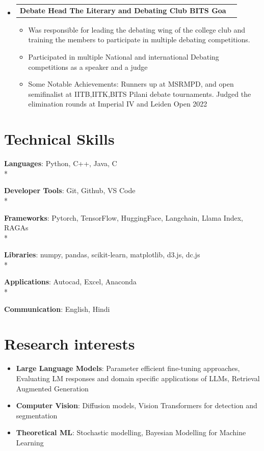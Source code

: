 \documentclass[letterpaper,11pt]{article}
\makeatletter
\newcommand{\resumeItem}[1]{
  \item\small{
    {#1 \vspace{-1pt}}
  }
}
\newcommand{\resumeProjectHeading}[2]{
  \item
  \begin{tabular*}{0.97\textwidth}{l@{\extracolsep{\fill}}r}
    \textbf{#1} & #2 \\
  \end{tabular*}\vspace{-7pt}
}
\newcommand{\resumeSubHeadingListStart}{\begin{itemize}[leftmargin=0.15in, label={}]}
\newcommand{\resumeSubHeadingListEnd}{\end{itemize}}
\newcommand{\resumeItemListStart}{\begin{itemize}}
\newcommand{\resumeItemListEnd}{\end{itemize}\vspace{-5pt}}
\makeatother
\begin{document}
\resumeSubHeadingListStart
\resumeProjectHeading
  {\textbf{Debate Head} \hfill \textbf{The Literary and Debating Club BITS Goa}} {}
  \resumeItemListStart
  \resumeItem{Was responsible for leading the debating wing of the college club and training the members to participate in multiple debating competitions.}
  \resumeItem{Participated in multiple National and international Debating competitions as a speaker and a judge}
  \resumeItem{Some Notable Achievements: Runners up at MSRMPD, and open semifinalist at IITB,IITK,BITS Pilani debate tournaments. Judged the elimination rounds at Imperial IV and Leiden Open 2022}
  \resumeItemListEnd
\resumeSubHeadingListEnd

\section{Technical Skills}

\begin{itemize}[label={}]
  \small{
    \item \textbf{Languages}{: Python, C++, Java, C} \\* %
    \item \textbf{Developer Tools}{: Git, Github, VS Code} \\*
    \item \textbf{Frameworks}{: Pytorch, TensorFlow, HuggingFace, Langchain, Llama Index, RAGAs} \\*
    \item \textbf{Libraries}{: numpy, pandas, scikit-learn, matplotlib, d3.js, dc.js} \\*
    \item \textbf{Applications}{: Autocad, Excel, Anaconda} \\*
    \item \textbf{Communication}{: English, Hindi}
  }
\end{itemize}



\section{Research interests}

\resumeSubHeadingListStart
\resumeItem{{\textbf{Large Language Models}{: Parameter efficient fine-tuning approaches, Evaluating LM responses and domain specific applications of LLMs, Retrieval Augmented Generation}}}
\resumeItem{\textbf{Computer Vision}{: Diffusion models, Vision Transformers for detection and segmentation}}
\resumeItem{\textbf{Theoretical ML}{: Stochastic modelling, Bayesian Modelling for Machine Learning}}
\resumeSubHeadingListEnd






\end{document}
